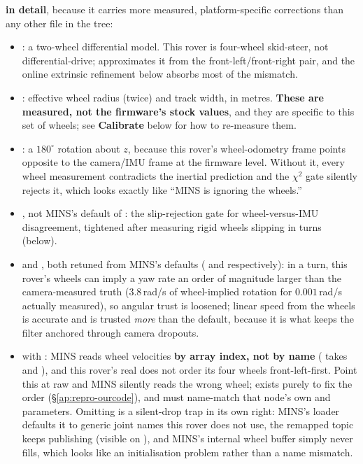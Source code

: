 \noindent\textbf{ in detail}, because it carries more
measured, platform-specific corrections than any other file in the tree:
\begin{itemize}[leftmargin=1.4em]
\item {}: a two-wheel differential model. This rover is
  four-wheel skid-steer, not differential-drive; 
  approximates it from the front-left/front-right pair, and the online
  extrinsic refinement below absorbs most of the mismatch.
\item {}: effective wheel radius
  (twice) and track width, in metres. \textbf{These are measured, not the
  firmware's stock values}, and they are specific to this set of wheels; see
  \textbf{Calibrate} below for how to re-measure them.
\item {}: a $180^\circ$ rotation about $z$, because this
  rover's wheel-odometry frame points opposite to the camera/IMU frame at the
  firmware level. Without it, every wheel measurement contradicts the
  inertial prediction and the $\chi^2$ gate silently rejects it, which looks
  exactly like ``MINS is ignoring the wheels.''
\item {}, not MINS's default of : the
  slip-rejection gate for wheel-versus-IMU disagreement, tightened after
  measuring rigid wheels slipping in turns (below).
\item {} and , both retuned from MINS's
  defaults ( and  respectively): in a turn, this rover's
  wheels can imply a yaw rate an order of magnitude larger than the
  camera-measured truth ($3.8$\,rad/s of wheel-implied rotation for
  $0.001$\,rad/s actually measured), so angular trust is loosened; linear
  speed from the wheels is accurate and is trusted \emph{more} than the
  default, because it is what keeps the filter anchored through camera
  dropouts.
\item {} with
  : MINS reads wheel
  velocities \textbf{by array index, not by name}
  ( takes  and
  ), and this rover's real  does not order
  its four wheels front-left-first. Point this at raw 
  and MINS silently reads the wrong wheel;  exists
  purely to fix the order (\S\ref{ap:repro-ourcode}), and 
  must name-match that node's own 
  and  parameters. Omitting
   is a silent-drop trap in its own right: MINS's loader
  defaults it to generic joint names this rover does not use, the remapped
  topic keeps publishing (visible on ), and MINS's internal
  wheel buffer simply never fills, which looks like an initialisation problem
  rather than a name mismatch.
\end{itemize}

